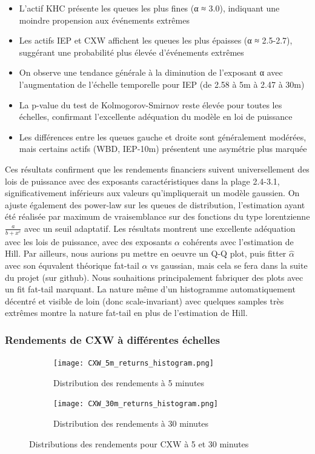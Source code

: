 \documentclass[10pt,a4paper]{article}
\theoremstyle{definition}
\theoremstyle{remark}
\begin{document}
\begin{itemize}
\begin{itemize}
    \item L'actif KHC présente les queues les plus fines (α ≈ 3.0), indiquant une moindre propension aux événements extrêmes
    \item Les actifs IEP et CXW affichent les queues les plus épaisses (α ≈ 2.5-2.7), suggérant une probabilité plus élevée d'événements extrêmes
    \item On observe une tendance générale à la diminution de l'exposant α avec l'augmentation de l'échelle temporelle pour IEP (de 2.58 à 5m à 2.47 à 30m)
    \item La p-value du test de Kolmogorov-Smirnov reste élevée pour toutes les échelles, confirmant l'excellente adéquation du modèle en loi de puissance
    \item Les différences entre les queues gauche et droite sont généralement modérées, mais certains actifs (WBD, IEP-10m) présentent une asymétrie plus marquée
\end{itemize}
Ces résultats confirment que les rendements financiers suivent universellement des lois de puissance avec des exposants caractéristiques dans la plage 2.4-3.1, significativement inférieurs aux valeurs qu'impliquerait un modèle gaussien. On ajuste également des power-law sur les queues de distribution, l'estimation ayant été réalisée par maximum de vraisemblance sur des fonctions du type lorentzienne $\frac{a}{b+x^c}$ avec un seuil adaptatif. Les résultats montrent une excellente adéquation avec les lois de puissance, avec des exposants $\alpha$ cohérents avec l'estimation de Hill. Par ailleurs, nous aurions pu mettre en oeuvre un Q-Q plot, puis fitter $\hat \alpha$ avec son équvalent théorique fat-tail $\alpha$ vs gaussian, mais cela se fera dans la suite du projet (sur github). Nous souhaitions principalement fabriquer des plots avec un fit fat-tail marquant. La nature même d'un histogramme automatiquement décentré et visible de loin (donc scale-invariant) avec quelques samples très extrêmes montre la nature fat-tail en plus de l'estimation de Hill.

\subsubsection{Rendements de CXW à différentes échelles}

\begin{figure}[H]
    \centering
    \begin{subfigure}[b]{0.45\textwidth}
        \texttt{[image: CXW\_5m\_returns\_histogram.png]}
        \caption{Distribution des rendements à 5 minutes}
        \label{fig:CXW_5m_moved}
    \end{subfigure}
    \hfill
    \begin{subfigure}[b]{0.45\textwidth}
        \texttt{[image: CXW\_30m\_returns\_histogram.png]}
        \caption{Distribution des rendements à 30 minutes}
        \label{fig:CXW_30m_moved}
    \end{subfigure}
    \caption{Distributions des rendements pour CXW à 5 et 30 minutes}
\end{figure}


\end{itemize}
\end{document}
